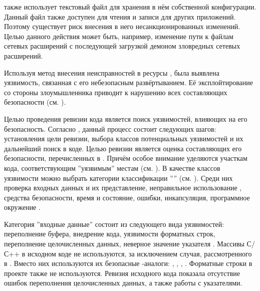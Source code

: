 %
 также использует текстовый файл для хранения в нём собственной конфигурации. 
%
Данный файл также доступен для чтения и записи для других приложений. 
%
Поэтому существует риск внесения в него несанкционированных изменений. 
%
Целью данного действия может быть, например, изменение пути к файлам сетевых расширений с последующей загрузкой демоном зловредных сетевых расширений.

%
Используя метод внесения неисправностей в ресурсы , была выявлена уязвимость, связанная с его небезопасным развёртыванием. 
%
Её эксплойтирование со стороны злоумышленника приводит к нарушению всех составляющих безопасности  (см. ).


%
Целью проведения ревизии кода  является поиск уязвимостей, влияющих на его безопасность.  
%
Согласно  , данный процесс состоит следующих шагов: установления цели ревизии, выбора классов потенциальных уязвимостей и их дальнейший поиск в коде. 
%
Целью ревизии  является оценка составляющих его безопасности, перечисленных в . 
%
Причём особое внимание уделяются участкам кода, соответствующим ''уязвимым'' местам (см. ). 
%
В качестве классов уязвимости можно выбрать категории классификации '''' (см. ). 
%
Среди них проверка входных данных и их представление, неправильное использование , средства безопасности, время и состояние, ошибки, инкапсуляция, программное окружение . 

%
Категория ''входные данные'' состоит из следующего вида уязвимостей: переполнение буфера, внедрение кода, уязвимости форматных строк, переполнение целочисленных данных, неверное значение указателя . 
%
Массивы С/С++ в исходном коде  не используются, за исключением случая, рассмотренного в . 
%
Вместо них используются их безопасные -аналоги: , , ,  . 
%
Форматные строки в проекте также не используются. 
%
Ревизия исходного кода показала отсутствие ошибок переполнения целочисленных данных, а также работы с указателями. 

